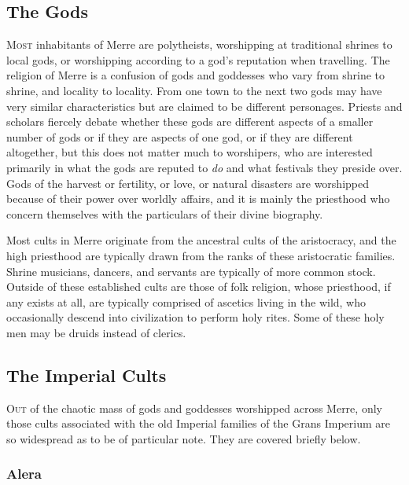 \documentclass[paper=a4, fontsize=11pt]{scrartcl} %
\begin{document}
\begin{multicols}{2} %

\subsection{The Gods}

\lettrine[lines=2]{\medievalsharp M}{ost} inhabitants of Merre are polytheists, worshipping at traditional shrines to local gods, or worshipping according to a god's reputation when travelling. The religion of Merre is a confusion of gods and goddesses who vary from shrine to shrine, and locality to locality. From one town to the next two gods may have very similar characteristics but are claimed to be different personages. Priests and scholars fiercely debate whether these gods are different aspects of a smaller number of gods or if they are aspects of one god, or if they are different altogether, but this does not matter much to worshipers, who are interested primarily in what the gods are reputed to \textit{do} and what festivals they preside over. Gods of the harvest or fertility, or love, or natural disasters are worshipped because of their power over worldly affairs, and it is mainly the priesthood who concern themselves with the particulars of their divine biography.

Most cults in Merre originate from the ancestral cults of the aristocracy, and the high priesthood are typically drawn from the ranks of these aristocratic families. Shrine musicians, dancers, and servants are typically of more common stock. Outside of these established cults are those of folk religion, whose priesthood, if any exists at all, are typically comprised of ascetics living in the wild, who occasionally descend into civilization to perform holy rites. Some of these holy men may be druids instead of clerics.

\subsection{The Imperial Cults}

\lettrine[lines=2]{\medievalsharp O}{ut} of the chaotic mass of gods and goddesses worshipped across Merre, only those cults associated with the old Imperial families of the Grans Imperium are so widespread as to be of particular note. They are covered briefly below.

\subsubsection{Alera}


\end{multicols}
\end{document}
